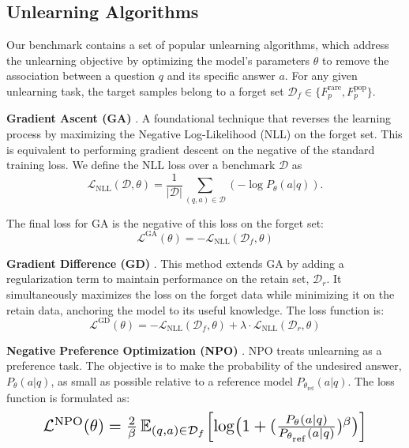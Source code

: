 \documentclass[11pt]{article}
\begin{document}
{\subsection{Unlearning Algorithms} %
\label{sec:train}

Our benchmark contains a set of popular unlearning algorithms, which address the unlearning objective by optimizing the model's parameters $\theta$ to remove the association between a question $q$ and its specific answer $a$. For any given unlearning task, the target samples belong to a forget set $\mathcal{D}_f \in \{F_p^{\text{rare}}, F_p^{\text{pop}}\}$.

\textbf{Gradient Ascent (GA)} \cite{jang2022knowledge}. 
A foundational technique that reverses the learning process by maximizing the Negative Log-Likelihood (NLL) on the forget set. This is equivalent to performing gradient descent on the negative of the standard training loss. We define the NLL loss over a benchmark $\mathcal{D}$ as 
\begin{equation}
\mathcal{L}_{\text{NLL}}(\mathcal{D}, \theta) = \frac{1}{|\mathcal{D}|} \sum_{(q,a) \in \mathcal{D}} (-\log P_{\theta}(a|q)). 
\end{equation}

The final loss for GA is the negative of this loss on the forget set:
\begin{equation}
\mathcal{L}^{\text{GA}}(\theta) = - \mathcal{L}_{\text{NLL}}(\mathcal{D}_f, \theta)
\end{equation}

\textbf{Gradient Difference (GD)} \cite{liu2022continual}.
This method extends GA by adding a regularization term to maintain performance on the retain set, $\mathcal{D}_r$. It simultaneously maximizes the loss on the forget data while minimizing it on the retain data, anchoring the model to its useful knowledge. The loss function is:
\begin{equation}
\mathcal{L}^{\text{GD}}(\theta) = -\mathcal{L}_{\text{NLL}}(\mathcal{D}_f, \theta) + \lambda \cdot \mathcal{L}_{\text{NLL}}(\mathcal{D}_r, \theta)
\end{equation}

\textbf{Negative Preference Optimization (NPO)} \cite{zhangnegative}.
NPO treats unlearning as a preference task. The objective is to make the probability of the undesired answer, $P_{\theta}(a|q)$, as small as possible relative to a reference model $P_{\theta_{\text{ref}}}(a|q)$. The loss function is formulated as:
\begin{equation}
\resizebox{0.85\linewidth}{!}{$
  \mathcal{L}^{\mathrm{NPO}}(\theta)
    = \frac{2}{\beta}\,
      \mathbb{E}_{(q,a)\in\mathcal{D}_f}
      \Bigl[\log\bigl(1+(\tfrac{P_{\theta}(a\mid q)}{P_{\theta_{\mathrm{ref}}}(a\mid q)})^{\beta}\bigr)\Bigr]
$}
\end{equation}

}
\end{document}
